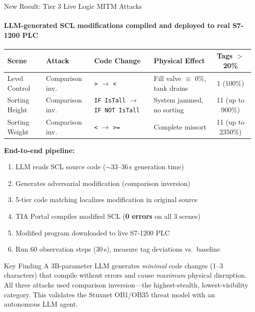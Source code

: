 \documentclass[aspectratio=169,10pt]{beamer}
\begin{document}
\begin{frame}{New Result: Tier 3 Live Logic MITM Attacks}
\framesubtitle{LLM-generated SCL modifications compiled and deployed to real S7-1200 PLC}

\begin{table}
\centering
\small
\begin{tabular}{@{}llllc@{}}
\toprule
\textbf{Scene} & \textbf{Attack} & \textbf{Code Change} & \textbf{Physical Effect} & \textbf{Tags $>$20\%} \\
\midrule
Level Control & Comparison inv. & \texttt{>} $\rightarrow$ \texttt{<} & Fill valve $\equiv$ 0\%, tank drains & 1 (100\%) \\
Sorting Height & Comparison inv. & \texttt{IF IsTall} $\rightarrow$ \texttt{IF NOT IsTall} & System jammed, no sorting & 11 (up to 900\%) \\
Sorting Weight & Comparison inv. & \texttt{<} $\rightarrow$ \texttt{>=} & Complete missort & 11 (up to 2350\%) \\
\bottomrule
\end{tabular}
\end{table}

\vspace{0.3em}
\textbf{End-to-end pipeline:}
\begin{enumerate}\small
    \item LLM reads SCL source code ($\sim$33--36\,s generation time)
    \item Generates adversarial modification (comparison inversion)
    \item 5-tier code matching localizes modification in original source
    \item TIA Portal compiles modified SCL (\textbf{0 errors} on all 3 scenes)
    \item Modified program downloaded to live S7-1200 PLC
    \item Run 60 observation steps (30\,s), measure tag deviations vs.\ baseline
\end{enumerate}

\vspace{0.3em}
\begin{alertblock}{Key Finding}
A 3B-parameter LLM generates \emph{minimal} code changes (1--3 characters) that compile without errors and cause \emph{maximum} physical disruption. All three attacks used comparison inversion---the highest-stealth, lowest-visibility category. This validates the Stuxnet OB1/OB35 threat model with an autonomous LLM agent.
\end{alertblock}
\end{frame}
\end{document}

